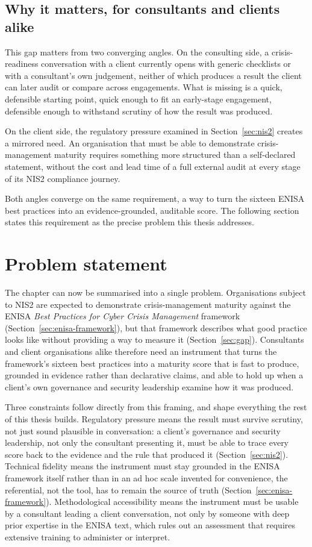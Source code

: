 \subsection{Why it matters, for consultants and clients alike}

This gap matters from two converging angles. On the consulting side, a
crisis-readiness conversation with a client currently opens with generic
checklists or with a consultant's own judgement, neither of which produces
a result the client can later audit or compare across engagements. What is
missing is a quick, defensible starting point, quick enough to fit an
early-stage engagement, defensible enough to withstand scrutiny of how the
result was produced.

On the client side, the regulatory pressure examined in Section~\ref{sec:nis2}
creates a mirrored need. An organisation that must be able to demonstrate
crisis-management maturity requires something more structured than a
self-declared statement, without the cost and lead time of a full external
audit at every stage of its NIS2 compliance journey.

Both angles converge on the same requirement, a way to turn the sixteen
ENISA best practices into an evidence-grounded, auditable score. The
following section states this requirement as the precise problem this
thesis addresses.

\section{Problem statement}
\label{sec:problem-statement}

The chapter can now be summarised into a single problem. Organisations
subject to NIS2 are expected to demonstrate crisis-management maturity
against the ENISA \emph{Best Practices for Cyber Crisis Management}
framework (Section~\ref{sec:enisa-framework}), but that framework describes what
good practice looks like without providing a way to measure it
(Section~\ref{sec:gap}). Consultants and client organisations alike therefore need
an instrument that turns the framework's sixteen best practices into a
maturity score that is fast to produce, grounded in evidence rather than
declarative claims, and able to hold up when a client's own governance and
security leadership examine how it was produced.

Three constraints follow directly from this framing, and shape everything
the rest of this thesis builds. Regulatory pressure means the result must
survive scrutiny, not just sound plausible in conversation: a client's
governance and security leadership, not only the consultant presenting it,
must be able to trace every score back to the evidence and the rule that
produced it (Section~\ref{sec:nis2}). Technical fidelity means the instrument must
stay grounded in the ENISA framework itself rather than in an ad hoc scale
invented for convenience, the referential, not the tool, has to remain the
source of truth (Section~\ref{sec:enisa-framework}). Methodological accessibility
means the instrument must be usable by a consultant leading a client
conversation, not only by someone with deep prior expertise in the ENISA
text, which rules out an assessment that requires extensive training to
administer or interpret.

